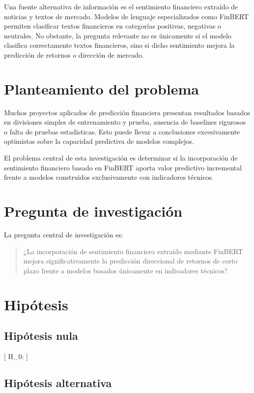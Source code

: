 \documentclass[12pt,a4paper]{article}
\begin{document}
Una fuente alternativa de información es el sentimiento financiero extraído de noticias y textos de mercado. Modelos de lenguaje especializados como FinBERT permiten clasificar textos financieros en categorías positivas, negativas o neutrales. No obstante, la pregunta relevante no es únicamente si el modelo clasifica correctamente textos financieros, sino si dicho sentimiento mejora la predicción de retornos o dirección de mercado.

\section{Planteamiento del problema}

Muchos proyectos aplicados de predicción financiera presentan resultados basados en divisiones simples de entrenamiento y prueba, ausencia de baselines rigurosos o falta de pruebas estadísticas. Esto puede llevar a conclusiones excesivamente optimistas sobre la capacidad predictiva de modelos complejos.

El problema central de esta investigación es determinar si la incorporación de sentimiento financiero basado en FinBERT aporta valor predictivo incremental frente a modelos construidos exclusivamente con indicadores técnicos.

\section{Pregunta de investigación}

La pregunta central de investigación es:

\begin{quote}
¿La incorporación de sentimiento financiero extraído mediante FinBERT mejora significativamente la predicción direccional de retornos de corto plazo frente a modelos basados únicamente en indicadores técnicos?
\end{quote}

\section{Hipótesis}

\subsection{Hipótesis nula}

[
H_0: 
]

\subsection{Hipótesis alternativa}
\end{document}
